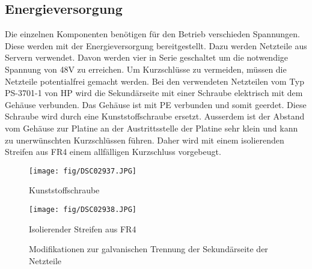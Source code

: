 \subsection{Energieversorgung}
Die einzelnen Komponenten benötigen für den Betrieb verschieden Spannungen. 
Diese werden mit der Energieversorgung bereitgestellt. Dazu werden Netzteile 
aus Servern verwendet. Davon werden vier in Serie geschaltet um die notwendige 
Spannung von 48\si{\volt} zu erreichen. Um Kurzschlüsse zu vermeiden, müssen 
die Netzteile potentialfrei gemacht werden. Bei den verwendeten Netzteilen vom 
Typ PS-3701-1 von HP wird die Sekundärseite mit einer Schraube elektrisch mit 
dem Gehäuse verbunden. Das Gehäuse ist mit PE verbunden und somit geerdet. 
Diese Schraube wird durch eine Kunststoffschraube ersetzt. Ausserdem ist der 
Abstand vom Gehäuse zur Platine an der Austrittsstelle der Platine sehr klein 
und kann zu unerwünschten Kurzschlüssen führen. Daher wird mit einem 
isolierenden Streifen aus FR4 einem allfälligen Kurzschluss vorgebeugt. 
\begin{figure}[h!]
    \begin{minipage}{0.5\textwidth}
        \centering
        \texttt{[image: fig/DSC02937.JPG]}
        \caption*{Kunststoffschraube}
        \label{fig:e_sup_mod_screw}
    \end{minipage}
    \begin{minipage}{0.5\textwidth}
        \centering
        \texttt{[image: fig/DSC02938.JPG]}
        \caption*{Isolierender Streifen aus FR4}
        \label{fig:e_sup_mod_strip}
    \end{minipage}
    \caption{Modifikationen zur galvanischen Trennung der Sekundärseite der Netzteile}
    \label{fig:e_sup_mod}
\end{figure}

